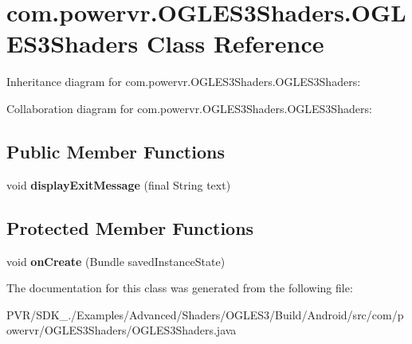\hypertarget{classcom_1_1powervr_1_1_o_g_l_e_s3_shaders_1_1_o_g_l_e_s3_shaders}{\section{com.\+powervr.\+O\+G\+L\+E\+S3\+Shaders.\+O\+G\+L\+E\+S3\+Shaders Class Reference}
\label{classcom_1_1powervr_1_1_o_g_l_e_s3_shaders_1_1_o_g_l_e_s3_shaders}
}


Inheritance diagram for com.\+powervr.\+O\+G\+L\+E\+S3\+Shaders.\+O\+G\+L\+E\+S3\+Shaders\+:


Collaboration diagram for com.\+powervr.\+O\+G\+L\+E\+S3\+Shaders.\+O\+G\+L\+E\+S3\+Shaders\+:
\subsection*{Public Member Functions}
\begin{DoxyCompactItemize}
\item 
\hypertarget{classcom_1_1powervr_1_1_o_g_l_e_s3_shaders_1_1_o_g_l_e_s3_shaders_afd64a4aa2509baf793c333e906412c98}{void {\bfseries display\+Exit\+Message} (final String text)}\label{classcom_1_1powervr_1_1_o_g_l_e_s3_shaders_1_1_o_g_l_e_s3_shaders_afd64a4aa2509baf793c333e906412c98}

\end{DoxyCompactItemize}
\subsection*{Protected Member Functions}
\begin{DoxyCompactItemize}
\item 
\hypertarget{classcom_1_1powervr_1_1_o_g_l_e_s3_shaders_1_1_o_g_l_e_s3_shaders_af8cb721b3157805c01364975d42a32ad}{void {\bfseries on\+Create} (Bundle saved\+Instance\+State)}\label{classcom_1_1powervr_1_1_o_g_l_e_s3_shaders_1_1_o_g_l_e_s3_shaders_af8cb721b3157805c01364975d42a32ad}

\end{DoxyCompactItemize}


The documentation for this class was generated from the following file\+:\begin{DoxyCompactItemize}
\item 
P\+V\+R/\+S\+D\+K\+\_./\+Examples/\+Advanced/\+Shaders/\+O\+G\+L\+E\+S3/\+Build/\+Android/src/com/powervr/\+O\+G\+L\+E\+S3\+Shaders/O\+G\+L\+E\+S3\+Shaders.\+java\end{DoxyCompactItemize}
